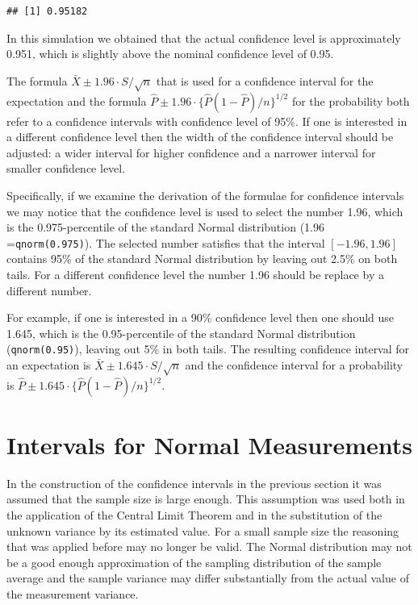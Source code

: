 \documentclass[
]{krantz}
\theoremstyle{definition}
\theoremstyle{definition}
\theoremstyle{definition}
\theoremstyle{remark}
\begin{document}
\begin{verbatim}
## [1] 0.95182
\end{verbatim}

In this simulation we obtained that the actual confidence level is
approximately 0.951, which is slightly above the nominal confidence
level of 0.95.

The formula \(\bar X \pm 1.96 \cdot S/\sqrt{n}\) that is used for a
confidence interval for the expectation and the formula
\(\hat P \pm 1.96 \cdot \{\hat P (1-\hat P)/n\}^{1/2}\) for the
probability both refer to a confidence intervals with confidence level
of 95\%. If one is interested in a different confidence level then the
width of the confidence interval should be adjusted: a wider interval
for higher confidence and a narrower interval for smaller confidence
level.

Specifically, if we examine the derivation of the formulae for
confidence intervals we may notice that the confidence level is used to
select the number 1.96, which is the 0.975-percentile of the standard
Normal distribution (1.96 =\texttt{qnorm(0.975)}). The selected number
satisfies that the interval \([-1.96,1.96]\) contains 95\% of the standard
Normal distribution by leaving out 2.5\% on both tails. For a different
confidence level the number 1.96 should be replace by a different
number.

For example, if one is interested in a 90\% confidence level then one
should use 1.645, which is the 0.95-percentile of the standard Normal
distribution (\texttt{qnorm(0.95)}), leaving out 5\% in both tails. The
resulting confidence interval for an expectation is
\(\bar X \pm 1.645 \cdot S/\sqrt{n}\) and the confidence interval for a
probability is \(\hat P \pm 1.645 \cdot \{\hat P (1-\hat P)/n\}^{1/2}\).

\hypertarget{CInormal}{%
\section{Intervals for Normal Measurements}\label{CInormal}}

In the construction of the confidence intervals in the previous section
it was assumed that the sample size is large enough. This assumption was
used both in the application of the Central Limit Theorem and in the
substitution of the unknown variance by its estimated value. For a small
sample size the reasoning that was applied before may no longer be
valid. The Normal distribution may not be a good enough approximation of
the sampling distribution of the sample average and the sample variance
may differ substantially from the actual value of the measurement
variance.
\end{document}
